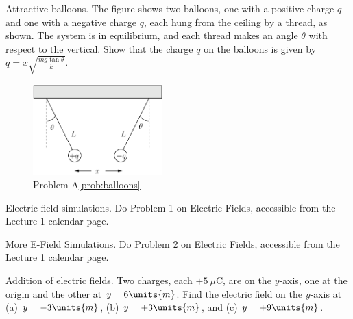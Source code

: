 \begin{aproblem}{Attractive balloons.}  
  The figure shows two balloons, one with a positive charge $q$ and
  one with a negative charge $q$, each hung from the ceiling by a
  thread, as shown.  The system is in equilibrium, and each thread
  makes an angle $\theta$ with respect to the vertical. Show that the
  charge $q$ on the balloons is given by $q =
  x\sqrt{\frac{mg\tan\theta}{k}}$.
  \label{prob:balloons}

  \begin{figure}[h]
    \begin{center}
      \includegraphics[width=5cm]{additional_problems/ballooncalc}
      \caption{Problem A\ref{prob:balloons}}
    \end{center}
  \end{figure}
\end{aproblem}


\begin{aproblem}{Electric field simulations.}  
  Do Problem 1 on Electric Fields, accessible from the Lecture 1
  calendar page.
\end{aproblem}


\begin{aproblem}{More E-Field Simulations.} 
  Do Problem 2 on Electric Fields, accessible from the Lecture 1
  calendar page.
\end{aproblem}

\begin{aproblem}{Addition of electric fields.} 
  Two charges, each $+5~\mu$C, are on the $y$-axis, one at the origin
  and the other at $y=6\units{m}$.  Find the electric field on the
  $y$-axis at (a) $y=-3\units{m}$, (b) $y = +3\units{m}$, and (c) $y =
  +9\units{m}$.
  \label{prob:addEfields}
\end{aproblem}

\newpage

